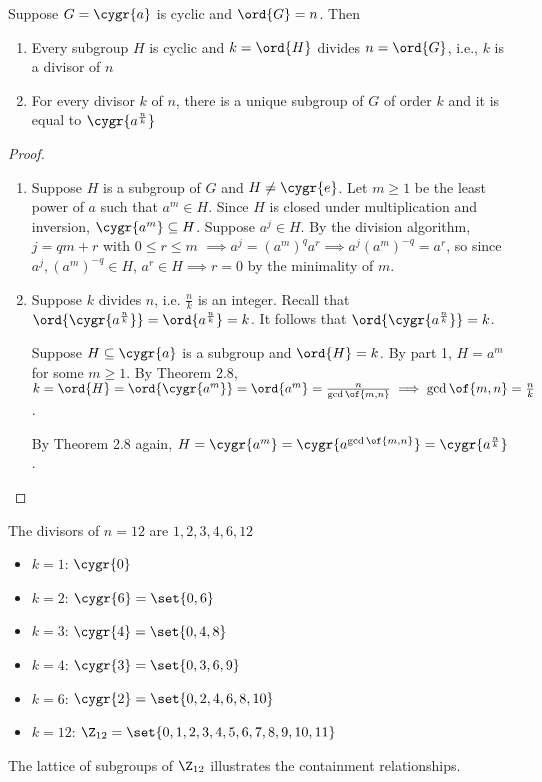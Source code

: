 \begin{theorem}
    Suppose $G = \cygr{a}$ is cyclic and $\ord{G} = n$. Then \begin{enumerate}
        \item Every subgroup $H$ is cyclic and $k = \ord{H}$ divides $n = \ord{G}$, i.e., $k$ is a divisor of $n$
        \item For every divisor $k$ of $n$, there is a unique subgroup of $G$ of order $k$ and it is equal to $\cygr{a^{\frac{n}{k}}}$
    \end{enumerate}
\end{theorem}
\begin{proof}
    \begin{enumerate}
        \item Suppose $H$ is a subgroup of $G$ and $H \neq \cygr{e}$. Let $m \geq 1$ be the least power of $a$ such that $a^m \in H$. Since $H$ is closed under multiplication and inversion, $\cygr{a^m} \subseteq H$. Suppose $a^j \in H$. By the division algorithm, $j = qm + r$ with $0 \leq r \leq m$ $\implies a^j = \left(a^m\right)^q a^r \implies a^j \left(a^m\right)^{-q} = a^r$, so since $a^j,\left(a^m\right)^{-q} \in H$, $a^r \in H \implies r = 0$ by the minimality of $m$.
        \item Suppose $k$ divides $n$, i.e. $\frac{n}{k}$ is an integer. Recall that $\ord{\cygr{a^\frac{n}{k}}} = \ord{a^\frac{n}{k}} = k$. It follows that $\ord{\cygr{a^\frac{n}{k}}} = k$.
        
        Suppose $H \subseteq \cygr{a}$ is a subgroup and $\ord{H} = k$. By part 1, $H = a^m$ for some $m \geq 1$. By Theorem 2.8, $k = \ord{H} = \ord{\cygr{a^m}} = \ord{a^m} = \frac{n}{\gcd\of{m,n}} \implies \gcd\of{m,n} = \frac{n}{k}$.

        By Theorem 2.8 again, $H = \cygr{a^m} = \cygr{a^{\gcd\of{m,n}}} = \cygr{a^\frac{n}{k}}$.
    \end{enumerate}
\end{proof}

\newpage

\begin{example}
    The divisors of $n = 12$ are $1,2,3,4,6,12$
    \begin{itemize}
        \item $k = 1$: $\cygr{0}$
        \item $k = 2$: $\cygr{6} = \set{0,6}$
        \item $k = 3$: $\cygr{4} = \set{0,4,8}$
        \item $k = 4$: $\cygr{3} = \set{0,3,6,9}$
        \item $k = 6$: $\cygr{2} = \set{0,2,4,6,8,10}$
        \item $k = 12$: $\Z_{12} = \set{0,1,2,3,4,5,6,7,8,9,10,11}$
    \end{itemize}
    \begin{note}
        The lattice of subgroups of $\Z_{12}$ illustrates the containment relationships.
        \insertimage[0.5]
    \end{note}
\end{example}

